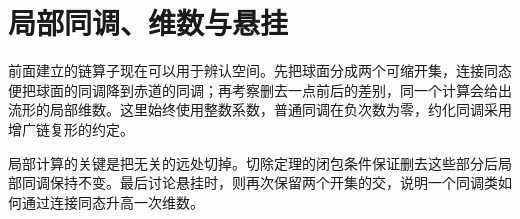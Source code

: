 
% 
% 
% 

\section{局部同调、维数与悬挂}
\label{g2:sec:0204}

前面建立的链算子现在可以用于辨认空间。先把球面分成两个可缩开集，连接同态便把球面的同调降到赤道的同调；再考察删去一点前后的差别，同一个计算会给出流形的局部维数。这里始终使用整数系数，普通同调在负次数为零，约化同调采用增广链复形的约定。

\ProseParagraphBreak

局部计算的关键是把无关的远处切掉。切除定理的闭包条件保证删去这些部分后局部同调保持不变。最后讨论悬挂时，则再次保留两个开集的交，说明一个同调类如何通过连接同态升高一次维数。

